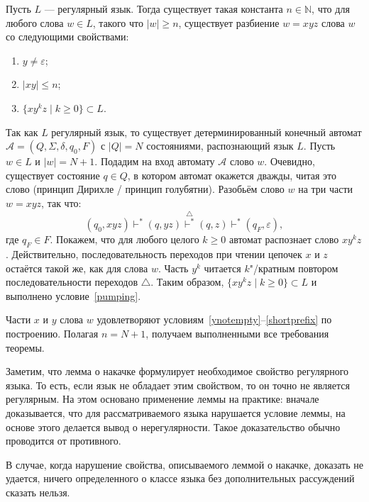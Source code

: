 \begin{mytheorem}
\label{theorem-PumpingLemma}
Пусть $L$ — регулярный язык.
Тогда существует такая константа $n\in \mathbb N$, что для любого слова $w \in L$,
такого что $|w|\geqslant n$, существует разбиение $w=xyz$ слова $w$ со следующими свойствами:
\begin{enumerate}
  \item\label{ynotempty} $y \neq \varepsilon$;
  \item\label{shortprefix} $|xy| \leqslant n$;
  \item\label{pumping} $\{ xy^kz \mid k \geqslant 0\} \subset L$.
\end{enumerate}
\end{mytheorem}
\begin{myproof}
Так как $L$ регулярный язык, то существует детерминированный конечный автомат
$\mathcal A=(Q, \Sigma, \delta, q_0, F)$ с $|Q|=N$ состояниями, распознающий
язык $L$. Пусть $w \in L$ и $|w|=N+1$. Подадим на вход автомату $\mathcal A$
слово $w$. Очевидно, существует состояние $q \in Q$, в котором автомат окажется
дважды, читая это слово (принцип Дирихле / принцип голубятни). Разобьём слово
$w$ на три части $w=xyz$, так что:
\[
    (q_0, xyz) \vdash^*  (q, yz) \stackrel{\bigtriangleup}{\vdash^*} (q, z)
    \vdash^* (q_F, \varepsilon),
\]
где $q_F \in F$. Покажем, что для любого целого $k \geqslant 0$ автомат
распознает слово $xy^kz$. Действительно, последовательность переходов при чтении
цепочек $x$ и $z$ остаётся такой же, как для слова $w$. Часть $y^k$ читается
$k$"/кратным повтором последовательности переходов $\bigtriangleup$. Таким
образом, $\{ xy^kz \mid k \geqslant 0\} \subset L$ и выполнено
условие~\ref{pumping}.

Части $x$ и $y$ слова $w$ удовлетворяют
условиям~\ref{ynotempty}–\ref{shortprefix} по построению. Полагая
$n=N+1$, получаем выполненными все требования теоремы.
\end{myproof}

Заметим, что лемма о накачке формулирует необходимое свойство регулярного языка. То есть, если язык не обладает этим свойством, то он точно не является регулярным. На этом основано применение леммы на практике: вначале доказывается, что для рассматриваемого языка нарушается условие леммы, на основе этого делается вывод о нерегулярности. Такое доказательство обычно проводится от противного.

В случае, когда нарушение свойства, описываемого леммой о накачке, доказать не удается, ничего определенного о классе языка без дополнительных рассуждений сказать нельзя.

